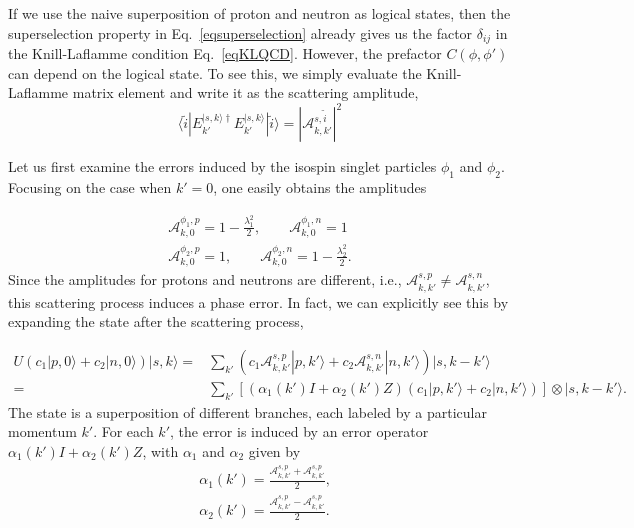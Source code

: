 \documentclass[11pt,english]{article}
\begin{document}
 
 If we use the naive superposition of proton and neutron as logical states, then the superselection property in Eq.~\eqref{eqsuperselection} already gives us the factor $\delta_{ij}$ in the Knill-Laflamme condition Eq.~\eqref{eqKLQCD}. However, the prefactor $C(\phi,\phi')$ can depend on the logical state.  To see this, we simply evaluate the Knill-Laflamme matrix element and write it as the scattering amplitude, 
\begin{equation}
    \langle\tilde{i}|E^{|s,k\rangle \dagger}_{k'}E^{|s,k\rangle}_{k'}|\tilde{i}\rangle=|\mathcal{A}^{s,\tilde{i}}_{k, k'}|^2
\end{equation}



Let us first examine the errors induced by the isospin singlet particles $\phi_1$ and $\phi_2$. Focusing on the case when $k'=0$, one easily obtains the amplitudes 
 
 \begin{equation}
 \begin{split}
     \mathcal{A}^{\phi_1,p}_{k,0}=1-\frac{\lambda_1^2}{2}, \qquad  \mathcal{A}^{\phi_1,n}_{k,0}=1\\
     \mathcal{A}^{\phi_2,p}_{k,0}=1, \qquad \mathcal{A}^{\phi_2,n}_{k,0}=1-\frac{\lambda_2^2}{2}. 
\end{split}
 \end{equation}
Since the amplitudes for protons and neutrons are different, i.e., $\mathcal{A}^{s,p}_{k,k'}\neq \mathcal{A}^{s,n}_{k,k'}$, this scattering process induces a phase error. In fact, we can explicitly see this by expanding the state after the scattering process, 


  
 
 \begin{equation}
 \begin{split}
     U(c_1|p,0\rangle+c_2|n,0\rangle)|s,k\rangle=&\sum_{k'}(c_1\mathcal{A}_{k,k'}^{s,p}|p,k'\rangle+c_2\mathcal{A}_{k,k'}^{s,n}|n,k'\rangle)|s,k-k'\rangle\\
     =&\sum_{k'}[(\alpha_1(k') I+\alpha_2(k') Z)(c_1|p,k'\rangle+c_2|n,k'\rangle)]\otimes|s,k-k'\rangle.
 \end{split}
 \end{equation}
The state is a superposition of  different branches, each labeled by a particular momentum $k'$. For each $k'$, the error is induced by an error operator $\alpha_1(k')I+\alpha_2(k')Z$, with $\alpha_1$ and $\alpha_2$ given by 
\begin{equation}
\begin{split}
   & \alpha_1(k')=\frac{\mathcal{A}_{k,k'}^{s,p}+\mathcal{A}_{k,k'}^{s,p}}{2},\\
   & \alpha_2(k')=\frac{\mathcal{A}_{k,k'}^{s,p}-\mathcal{A}_{k,k'}^{s,p}}{2}.
\end{split}
\end{equation}
\end{document}
